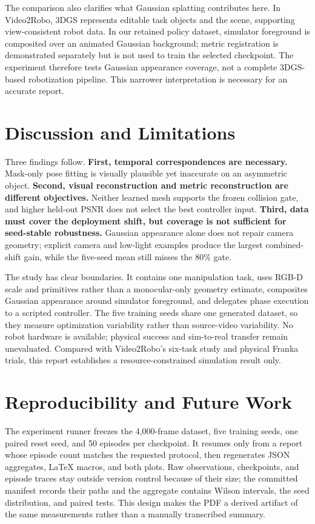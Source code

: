 \documentclass[10pt,twocolumn,letterpaper]{article}
\begin{document}
The comparison also clarifies what Gaussian splatting contributes here. In
Video2Robo, 3DGS represents editable task objects and the scene, supporting
view-consistent robot data. In our retained policy dataset, simulator foreground
is composited over an animated Gaussian background; metric registration is
demonstrated separately but is not used to train the selected checkpoint. The
experiment therefore tests Gaussian appearance coverage, not a complete
3DGS-based robotization pipeline. This narrower interpretation is necessary for
an accurate report.

\section{Discussion and Limitations}
Three findings follow. \textbf{First, temporal correspondences are necessary.}
Mask-only pose fitting is visually plausible yet inaccurate on an asymmetric
object. \textbf{Second, visual reconstruction and metric reconstruction are
different objectives.} Neither learned mesh supports the frozen collision gate,
and higher held-out PSNR does not select the best controller input.
\textbf{Third, data must cover the deployment shift, but coverage is not
sufficient for seed-stable robustness.} Gaussian appearance alone does not
repair camera geometry; explicit camera and low-light examples produce the
largest combined-shift gain, while the five-seed mean still misses the 80\% gate.

The study has clear boundaries. It contains one manipulation task, uses RGB-D
scale and primitives rather than a monocular-only geometry estimate, composites
Gaussian appearance around simulator foreground, and delegates phase execution
to a scripted controller. The five training seeds share one generated dataset,
so they measure optimization variability rather than source-video variability.
No robot hardware is available; physical success and sim-to-real transfer remain
unevaluated. Compared with Video2Robo's six-task study and physical Franka trials,
this report establishes a resource-constrained simulation result only.

\section{Reproducibility and Future Work}
The experiment runner freezes the 4,000-frame dataset, five training seeds, one
paired reset seed, and 50 episodes per checkpoint. It resumes only from a report
whose episode count matches the requested protocol, then regenerates JSON
aggregates, LaTeX macros, and both plots. Raw observations, checkpoints, and
episode traces stay outside version control because of their size; the committed
manifest records their paths and the aggregate contains Wilson intervals, the
seed distribution, and paired tests. This design makes the PDF a derived artifact
of the same measurements rather than a manually transcribed summary.
\end{document}
